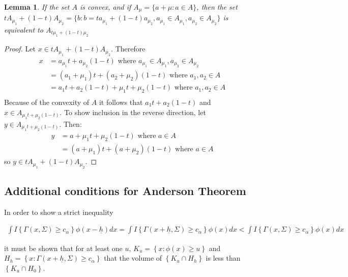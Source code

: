 \documentclass{article}
\newtheorem{lemma}[theorem]{Lemma}
\newcounter{conditions}
\begin{document}
\begin{lemma}
	\label{lemma:set_convexity}
	If the set $A$ is convex, and if $A_\mu = \{a + \mu : a \in A\}$, then the set $t A_{\mu_1} + (1 - t) A_{\mu_2} = \{b : b = ta_{\mu_1} + (1 - t)a_{\mu_2}, a_{\mu_1} \in A_{\mu_1}, a_{\mu_2} \in A_{\mu_2}\}$ is equivalent to $A_{t\mu_1 + (1 - t) \mu_2}$
\end{lemma}
\begin{proof}
	Let $x \in t A_{\mu_1} + (1 - t) A_{\mu_2}$.  Therefore
	\begin{align*}
		x &= a_{\mu_1}t + a_{\mu_2}(1 - t) \text{ where } a_{\mu_1} \in A_{\mu_1}, a_{\mu_2} \in A_{\mu_2}\\
		 &= (a_1 + \mu_1) t + (a_2 + \mu_2)(1 - t) \text{ where } a_1, a_2 \in A\\
		 &= a_1 t + a_2 (1 - t) + \mu_1 t + \mu_2 (1 - t) \text{ where } a_1, a_2 \in A\\
	\end{align*}
	Because of the convexity of $A$ it follows that $a_1 t + a_2 (1 - t)$ and $x \in A_{\mu_1 t + \mu_2 (1 - t)}$.  To show inclusion in the reverse direction, let $y \in A_{\mu_1 t + \mu_2 (1 - t)}$.  Then:
	\begin{align*}
		y &= a + \mu_1 t + \mu_2 (1 - t) \text{ where } a \in A\\
		 &= (a + \mu_1) t + (a + \mu_2) (1 - t) \text{ where } a \in A
	\end{align*}
	so $y \in t A_{\mu_1} + (1 - t) A_{\mu_2}$.
\end{proof}

\subsection*{Additional conditions for Anderson Theorem}
In order to show a strict inequality 

\begin{align*}
\int I\left\{\Gamma(x, \Sigma) \geq c_{\alpha}\right\} \phi(x - \underline{h}) dx = \int I\left\{\Gamma(x + \underline{h}, \Sigma) \geq c_{\alpha}\right\} \phi(x ) dx  < \int I\left\{\Gamma(x, \Sigma) \geq c_{\alpha}\right\} \phi(x) dx \label{eqn:decreasing_part} 
\end{align*}


it must be shown that for at least one $u$, $K_u = \left\{ x : \phi(x) \geq u\right\}$ and $H_h = \left\{x : \Gamma(x + \underline{h}, \Sigma) \geq c_\alpha\right\}$ that the volume of $\left\{K_u \cap H_h \right\}$ is less than $\left\{K_u \cap H_0 \right\}$. 
\end{document}
